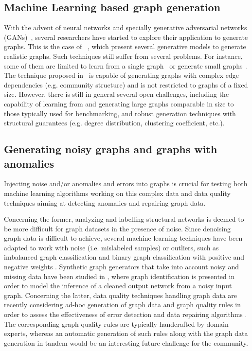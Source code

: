 \subsection{Machine Learning based graph generation}

With the advent of neural networks and specially generative adversarial networks
(GANs)~\cite{goodfellow2014generative}, several researchers have started to
explore their application to generate graphs. This is the case of
~\cite{kipf2016variational,grover2018graphite,simonovsky2018graphvae,li2018learning,you2018graphrnn},
which present several generative models to generate realistic graphs.  Such
techniques still suffer from several problems. For instance, some of them are
limited to learn from a single
graph~\cite{kipf2016variational,grover2018graphite} or generate small
graphs~\cite{simonovsky2018graphvae,li2018learning,you2018graphrnn}. The
technique proposed in~\cite{you2018graphrnn} is capable of generating graphs
with complex edge dependencies (e.g. community structure) and is not restricted
to graphs of a fixed size. However, there is still in general several open
challenges, including the capability of learning from and generating large graphs comparable
in size to those typically used for benchmarking, and robust generation
techniques with structural guarantees (e.g. degree distribution, clustering
coefficient, etc.).


\subsection{Generating noisy graphs and graphs with anomalies}
Injecting noise and/or anomalies and errors into graphs is crucial for
testing both machine learning algorithms working on this complex data and
data quality techniques aiming at detecting anomalies and repairing graph
data.

Concerning the former, analyzing and labelling structural networks is
deemed to be more difficult for graph datasets in the presence of noise.
Since denoising graph data is difficult to achieve, several machine learning
techniques have been adapted to work with noise (i.e. mislabeled
samples) or outliers, such as
imbalanced graph classification \cite{PanZ13} and
binary graph classification with positive and negative weights \cite{CheungSML16}.
Synthetic graph generators that take into account noisy and missing data
have been studied in \cite{NamataG10}, where graph identification is presented in
order to  model the inference of a cleaned output network from a
noisy input graph.
Concerning the latter, data quality techniques handling graph data are recently considering ad-hoc
generation of graph data and graph quality rules in order to assess the
effectiveness of error detection and data repairing algorithms \cite{FanWX16a,AriouaB18}. The
corresponding graph quality rules are typically handcrafted by domain
experts, whereas an automatic generation of such rules along with the graph
data generation in tandem would be an interesting future challenge for the
community.

